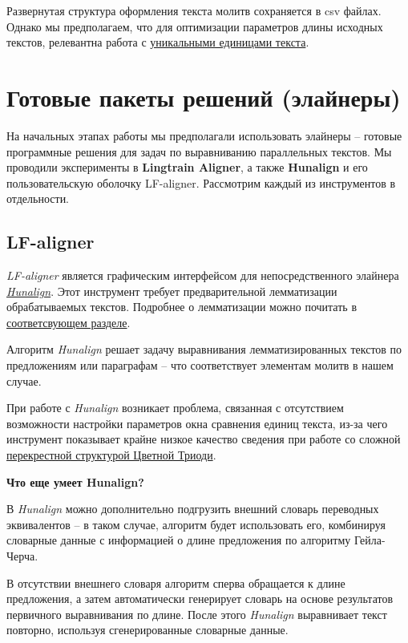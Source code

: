 \documentclass[
  letterpaper,
]{book}
\begin{document}
Развернутая структура оформления текста молитв сохраняется в csv файлах.
Однако мы предполагаем, что для оптимизации параметров длины исходных
текстов, релевантна работа с
\href{https://github.com/Drozhzhinastya/GSPC/tree/main/texts/unique_units}{уникальными
единицами текста}.


\hypertarget{sec-about_aligners}{%
\chapter{Готовые пакеты решений (элайнеры)}\label{sec-about_aligners}}

На начальных этапах работы мы предполагали использовать элайнеры --
готовые программные решения для задач по выравниванию параллельных
текстов. Мы проводили эксперименты в \textbf{Lingtrain Aligner}, а также
\textbf{Hunalign} и его пользовательскую оболочку LF-aligner. Рассмотрим
каждый из инструментов в отдельности.

\hypertarget{sec-lf_aligner}{%
\section{LF-aligner}\label{sec-lf_aligner}}

\emph{LF-aligner} является графическим интерфейсом для непосредственного
элайнера
\emph{\href{https://github.com/danielvarga/hunalign}{Hunalign}}. Этот
инструмент требует предварительной лемматизации обрабатываемых текстов.
Подробнее о лемматизации можно почитать в
\protect\hyperlink{sec-about_lemmatization}{соответсвующем разделе}.

Алгоритм \emph{Hunalign} решает задачу выравнивания лемматизированных
текстов по предложениям или параграфам -- что соответствует элементам
молитв в нашем случае.

При работе с \emph{Hunalign} возникает проблема, связанная с отсутствием
возможности настройки параметров окна сравнения единиц текста, из-за
чего инструмент показывает крайне низкое качество сведения при работе со
сложной \protect\hyperlink{sec-element_order}{перекрестной структурой
Цветной Триоди}.

\begin{tcolorbox}[enhanced jigsaw, colframe=quarto-callout-note-color-frame, rightrule=.15mm, breakable, arc=.35mm, left=2mm, colback=white, bottomrule=.15mm, toprule=.15mm, leftrule=.75mm, opacityback=0]

\textbf{Что еще умеет Hunalign?}\vspace{2mm}

В \emph{Hunalign} можно дополнительно подгрузить внешний словарь
переводных эквивалентов -- в таком случае, алгоритм будет использовать
его, комбинируя словарные данные с информацией о длине предложения по
алгоритму Гейла-Черча.\footnotemark{}

В отсутствии внешнего словаря алгоритм сперва обращается к длине
предложения, а затем автоматически генерирует словарь на основе
результатов первичного выравнивания по длине. После этого
\emph{Hunalign} выравнивает текст повторно, используя сгенерированные
словарные данные.

\end{tcolorbox}
\end{document}
